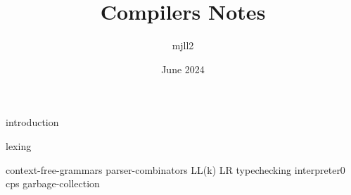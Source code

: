 \documentclass[12pt,a4paper,twoside,openany, chapterprefix=on]{scrbook}
\title{Compilers Notes}
\author{mjll2}
\date{June 2024}
\begin{document}
\maketitle

{introduction}

{lexing}

{context-free-grammars}
{parser-combinators}
{LL(k)}
{LR}
{typechecking}
{interpreter0}
{cps}
{garbage-collection}

\end{document}
